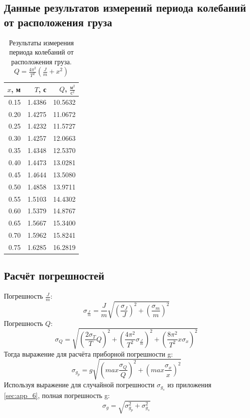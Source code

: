 \documentclass[12pt]{article}
\begin{document}
\subsection{Данные результатов измерений периода колебаний от расположения груза} \label{sec:app_4}
\begin{table}[H]
    \begin{center}
        \begin{tabular}{|r|r|r|}
            \hline
            $x$, м & $T$, с & $Q$, $\frac{\textrm{м}^2}{\textrm{с}^2}$ \\
            \hline
            0.15   & 1.4386 & 10.5632                                  \\
            0.20   & 1.4275 & 11.0672                                  \\
            0.25   & 1.4232 & 11.5727                                  \\
            0.30   & 1.4257 & 12.0663                                  \\
            0.35   & 1.4348 & 12.5370                                  \\
            0.40   & 1.4473 & 13.0281                                  \\
            0.45   & 1.4644 & 13.5080                                  \\
            0.50   & 1.4858 & 13.9711                                  \\
            0.55   & 1.5103 & 14.4302                                  \\
            0.60   & 1.5379 & 14.8767                                  \\
            0.65   & 1.5667 & 15.3400                                  \\
            0.70   & 1.5962 & 15.8241                                  \\
            0.75   & 1.6285 & 16.2819                                  \\
            \hline
        \end{tabular}
    \end{center}
    \caption{Результаты измерения периода колебаний от расположения груза. $Q = \frac{4\pi^2}{T^2}(\frac{J}{m} + x^2)$}
    \label{tab:2}
\end{table}

\subsection{Расчёт погрешностей} \label{sec:app_5}
Погрешность $\frac{J}{m}$:
$$\sigma_{\frac{J}{m}} = \frac{J}{m}\sqrt{(\frac{\sigma_J}{J})^2 + (\frac{\sigma_m}{m})^2}$$
Погрешность $Q$:
$$\sigma_Q = \sqrt{(\frac{2\sigma_T}{T}Q)^2 + (\frac{4\pi^2}{T^2}\sigma_{\frac{J}{m}})^2 + (\frac{8\pi^2}{T^2}x\sigma_x)^2}$$
Тогда выражение для расчёта приборной погрешности g:
$$\sigma_{g_p} = g\sqrt{(max\frac{\sigma_Q}{Q})^2 + (max\frac{\sigma_x}{x})^2}$$
Используя выражение для случайной погрешности $\sigma_{g_s}$ из приложения \ref{sec:app_6}, полная погрешность g:
$$\sigma_g = \sqrt{\sigma_{g_p}^2 + \sigma_{g_s}^2}$$
\end{document}
